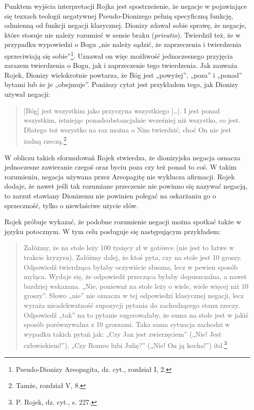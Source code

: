 Punktem wyjścia interpretacji Rojka jest spostrzeżenie, że negacje w
pojawiające się tezxach teologii negatywnej Pseudo-Dionizego pełnią
specyficzną funkcję, odmienną od funkcji negacji klasycznej. Dionizy
zdawał sobie sprawę, że negacje, które stosuje nie należy rozumieć w
sensie braku (\textit{privatio}). Twierdził też, że w przypadku
wypowiedzi o Bogu „nie należy sądzić, że zaprzeczenia i twierdzenia
sprzeciwiają się sobie”\footnote{Pseudo-Dionizy Areopagita, dz. cyt.,
rozdział I, 2. }. Uznawał on więc możliwość jednoczesnego przyjęcia
zarazem twierdzenia o Bogu, jak i zaprzeczenie tego twierdzenia. Jak
zauważa Rojek, Dionizy wielokrotnie powtarza, że Bóg jest „powyżej”,
„poza” i „ponad” bytami lub że je „obejmuje”. Poniższy cytat jest
przykładem tego, jak Dionizy używał negacji:



\begin{quote}
    [Bóg] jest wszystkim jako przyczyna wszystkiego […]. I jest ponad
wszystkim, istniejąc ponadsubstancjalnie wcześniej niż wszystko, co
jest. Dlatego też wszystko na raz można o Nim twierdzić, choć On nie
jest żadną rzeczą.\footnote{Tamże, rozdział V, 8. }
\end{quote}





W obliczu takich sformułowań Rojek stwierdza, że dionizyjska negacja
oznacza jednoczesne zawieranie czegoś oraz byciu poza czy też ponad to
coś. W takim rozumieniu, negacja używana przez Areopagitę nie wyklucza
afirmacji. Rojek dodaje, że nawet jeśli tak rozumiane przeczenie nie
powinno się nazywać negacją, to zarzut stawiany Dionizemu nie powinien
polegać na oskarżaniu go o sprzeczność, tylko o niewłaściwe użycie
słów.

Rojek próbuje wykazać, że podobne rozumienie negacji można spotkać także
w języku potocznym. W tym celu posługuje się następującym przykładem:

\begin{quote}
    Załóżmy, że na stole leży 100 tysięcy zł w gotówce (nie jest to łatwe w
trakcie kryzysu). Załóżmy dalej, że ktoś pyta, czy na stole jest 10
groszy. Odpowiedź twierdząca byłaby oczywiście słuszna, lecz w pewien
sposób myląca. Wydaje się, że odpowiedź przecząca byłaby dopuszczalna,
a nawet bardziej wskazana. „Nie, ponieważ na stole leży o wiele, wiele
więcej niż 10 groszy”. Słowo „nie” nie oznacza w tej odpowiedzi
klasycznej negacji, lecz wyraża nieadekwatność supozycji pytania do
zachodzącego stanu rzeczy. Odpowiedź „tak” na to pytanie sugerowałaby,
że suma na stole jest w jakiś sposób porównywalna z 10 groszami. Taka
sama sytuacja zachodzi w wypadku takich pytań jak: „Czy Jan jest
zwierzęciem” („Nie! Jest człowiekiem!”), „Czy Romeo lubi Julię?” („Nie!
On ją kocha!”) itd.\footnote{P. Rojek, dz. cyt., s. 227. }
\end{quote}






